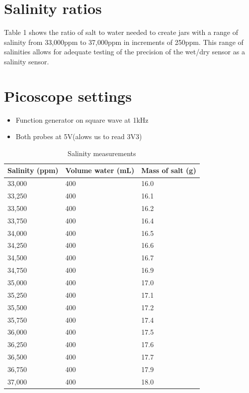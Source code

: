 \documentclass[twocolumn]{report}
\begin{document}
\section {Salinity ratios}
Table 1 shows the ratio of salt to water needed to create jars with a range of salinity from 33,000ppm to 37,000ppm in increments of 250ppm. This range of salinities allows for adequate testing of the precision of the wet/dry sensor as a salinity sensor. 


\section{Picoscope settings}
\begin{itemize}
\item Function generator on square wave at 1kHz
\item Both probes at 5V(alows us to read 3V3)
\end{itemize}
 
\begin{table}[]
\caption{Salinity measurements}
\begin{tabular}{lll}
\hline
Salinity (ppm) & Volume water (mL) & Mass of salt (g) \\ \hline
33,000         & 400               & 16.0             \\
33,250         & 400               & 16.1             \\
33,500         & 400               & 16.2             \\
33,750         & 400               & 16.4             \\
34,000         & 400               & 16.5             \\
34,250         & 400               & 16.6             \\
34,500         & 400               & 16.7             \\
34,750         & 400               & 16.9             \\
35,000         & 400               & 17.0             \\
35,250         & 400               & 17.1             \\
35,500         & 400               & 17.2             \\
35,750         & 400               & 17.4             \\
36,000         & 400               & 17.5             \\
36,250         & 400               & 17.6             \\
36,500         & 400               & 17.7             \\
36,750         & 400               & 17.9             \\
37,000         & 400               & 18.0             \\ \hline
\end{tabular}
\end{table}
\end{document}
